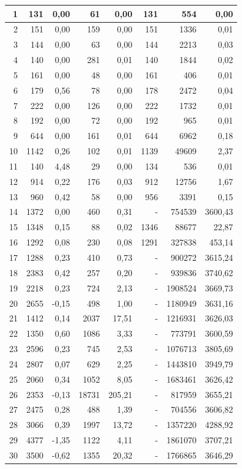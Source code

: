 \begin{table}[H]
\begin{tabular}{|r|rrrr|rrr|}
		1	&	131	&	0,00	&	61	&	0,00	&	131	&	554	&	0,00	\\ \hline
		2	&	151	&	0,00	&	159	&	0,00	&	151	&	1336	&	0,01	\\ \hline
		3	&	144	&	0,00	&	63	&	0,00	&	144	&	2213	&	0,03	\\ \hline
		4	&	140	&	0,00	&	281	&	0,01	&	140	&	1844	&	0,02	\\ \hline
		5	&	161	&	0,00	&	48	&	0,00	&	161	&	406	&	0,01	\\ \hline
		6	&	179	&	0,56	&	78	&	0,00	&	178	&	2472	&	0,04	\\ \hline
		7	&	222	&	0,00	&	126	&	0,00	&	222	&	1732	&	0,01	\\ \hline
		8	&	192	&	0,00	&	72	&	0,00	&	192	&	965	&	0,01	\\ \hline
		9	&	644	&	0,00	&	161	&	0,01	&	644	&	6962	&	0,18	\\ \hline
		10	&	1142	&	0,26	&	102	&	0,01	&	1139	&	49609	&	2,37	\\ \hline
		11	&	140	&	4,48	&	29	&	0,00	&	134	&	536	&	0,01	\\ \hline
		12	&	914	&	0,22	&	176	&	0,03	&	912	&	12756	&	1,67	\\ \hline
		13	&	960	&	0,42	&	58	&	0,00	&	956	&	3391	&	0,15	\\ \hline
		14	&	1372	&	0,00	&	460	&	0,31	&	-	&	754539	&	3600,43	\\ \hline
		15	&	1348	&	0,15	&	88	&	0,02	&	1346	&	88677	&	22,87	\\ \hline
		16	&	1292	&	0,08	&	230	&	0,08	&	1291	&	327838	&	453,14	\\ \hline
		17	&	1288	&	0,23	&	410	&	0,73	&	-	&	900272	&	3615,24	\\ \hline
		18	&	2383	&	0,42	&	257	&	0,20	&	-	&	939836	&	3740,62	\\ \hline
		19	&	2218	&	0,23	&	724	&	2,13	&	-	&	1908524	&	3669,73	\\ \hline
		20	&	2655	&	-0,15	&	498	&	1,00	&	-	&	1180949	&	3631,16	\\ \hline
		21	&	1412	&	0,14	&	2037	&	17,51	&	-	&	1216931	&	3626,03	\\ \hline
		22	&	1350	&	0,60	&	1086	&	3,33	&	-	&	773791	&	3600,59	\\ \hline
		23	&	2596	&	0,23	&	745	&	2,53	&	-	&	1076713	&	3805,69	\\ \hline
		24	&	2807	&	0,07	&	629	&	2,25	&	-	&	1443810	&	3949,79	\\ \hline
		25	&	2060	&	0,34	&	1052	&	8,05	&	-	&	1683461	&	3626,42	\\ \hline
		26	&	2353	&	-0,13	&	18731	&	205,21	&	-	&	817959	&	3655,21	\\ \hline
		27	&	2475	&	0,28	&	488	&	1,39	&	-	&	704556	&	3606,82	\\ \hline
		28	&	3066	&	0,39	&	1997	&	13,72	&	-	&	1357220	&	4288,92	\\ \hline
		29	&	4377	&	-1,35	&	1122	&	4,11	&	-	&	1861070	&	3707,21	\\ \hline
		30	&	3500	&	-0,62	&	1355	&	20,32	&	-	&	1766865	&	3646,29	\\ \hline
		

\end{tabular}
\end{table}

